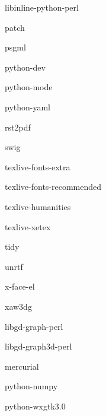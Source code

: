 \documentclass[12pt]{article}
\begin{document}
\begin{description}
\item libinline-python-perl

\item patch
\item psgml
\item python-dev
\item python-mode
\item python-yaml
\item rst2pdf
\item swig



\item texlive-fonts-extra
\item texlive-fonts-recommended
\item texlive-humanities
\item texlive-xetex


\item tidy
\item unrtf
\item x-face-el
\item xaw3dg



\item libgd-graph-perl
\item libgd-graph3d-perl


\item mercurial
\item python-numpy
\item python-wxgtk3.0


\end{description}
\end{document}
